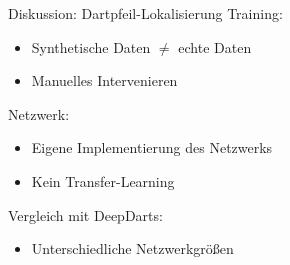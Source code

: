 \begin{frame}{Diskussion: Dartpfeil-Lokalisierung}
    Training:\\
    \begin{itemize}
        \item Synthetische Daten $\neq$ echte Daten
        \item Manuelles Intervenieren
    \end{itemize}

    Netzwerk:\\
    \begin{itemize}
        \item Eigene Implementierung des Netzwerks
        \item Kein Transfer-Learning
    \end{itemize}

    Vergleich mit DeepDarts:\\
    \begin{itemize}
        \item Unterschiedliche Netzwerkgrößen
    \end{itemize}
\end{frame}
